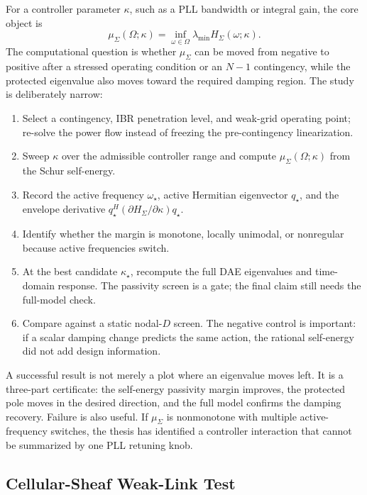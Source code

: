 For a controller parameter \(\kappa\), such as a PLL bandwidth or integral gain,
the core object is
\[
  \mu_\Sigma(\Omega;\kappa)=
  \inf_{\omega\in\Omega}
  \lambda_{\min} H_\Sigma(\omega;\kappa).
\]
The computational question is whether \(\mu_\Sigma\) can be moved from negative
to positive after a stressed operating condition or an \(N-1\) contingency, while
the protected eigenvalue also moves toward the required damping region. The
study is deliberately narrow:
\begin{enumerate}
\item Select a contingency, IBR penetration level, and weak-grid operating
point; re-solve the power flow instead of freezing the pre-contingency
linearization.
\item Sweep \(\kappa\) over the admissible controller range and compute
\(\mu_\Sigma(\Omega;\kappa)\) from the Schur self-energy.
\item Record the active frequency \(\omega_\star\), active Hermitian eigenvector
\(q_\star\), and the envelope derivative
\(q_\star^H(\partial H_\Sigma/\partial\kappa)q_\star\).
\item Identify whether the margin is monotone, locally unimodal, or nonregular
because active frequencies switch.
\item At the best candidate \(\kappa_\star\), recompute the full DAE eigenvalues
and time-domain response. The passivity screen is a gate; the final claim still
needs the full-model check.
\item Compare against a static nodal-\(D\) screen. The negative control is
important: if a scalar damping change predicts the same action, the rational
self-energy did not add design information.
\end{enumerate}

A successful result is not merely a plot where an eigenvalue moves left. It is a
three-part certificate: the self-energy passivity margin improves, the protected
pole moves in the desired direction, and the full model confirms the damping
recovery. Failure is also useful. If \(\mu_\Sigma\) is nonmonotone with multiple
active-frequency switches, the thesis has identified a controller interaction
that cannot be summarized by one PLL retuning knob.

\subsection{Cellular-Sheaf Weak-Link Test}

